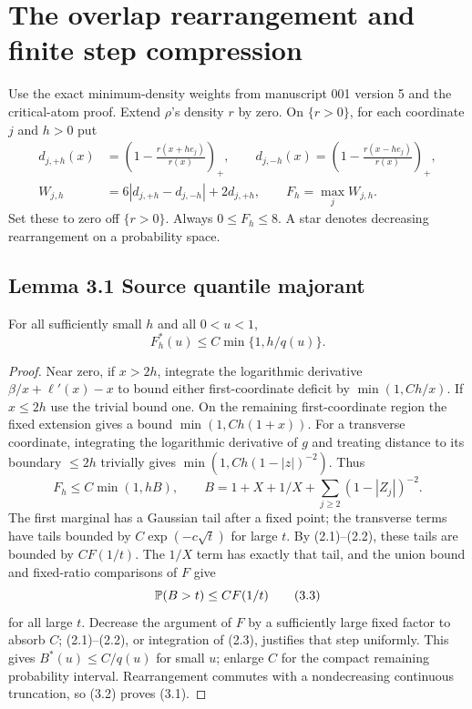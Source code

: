 \section{The overlap rearrangement and finite step compression}
Use the exact minimum-density weights from manuscript 001 version 5 and the critical-atom proof. Extend $\rho$'s density $r$ by zero. On $\{r>0\}$, for each coordinate $j$ and $h>0$ put
\begin{align*}
 d_{j,+h}(x)&=\left(1-\frac{r(x+he_j)}{r(x)}\right)_+,\qquad
 d_{j,-h}(x)=\left(1-\frac{r(x-he_j)}{r(x)}\right)_+,\\
 W_{j,h}&=6|d_{j,+h}-d_{j,-h}|+2d_{j,+h},\qquad F_h=\max_jW_{j,h}.
\end{align*}
Set these to zero off $\{r>0\}$. Always $0\le F_h\le8$. A star denotes decreasing rearrangement on a probability space.

\subsection*{Lemma 3.1 \quad Source quantile majorant}
For all sufficiently small $h$ and all $0<u<1$,
\begin{equation}
 F_h^*(u)\le C\min\{1,h/q(u)\}.\tag{3.1}
\end{equation}
\begin{proof}
Near zero, if $x>2h$, integrate the logarithmic derivative $\beta/x+\ell'(x)-x$ to bound either first-coordinate deficit by $\min(1,Ch/x)$. If $x\le2h$ use the trivial bound one. On the remaining first-coordinate region the fixed extension gives a bound $\min(1,Ch(1+x))$. For a transverse coordinate, integrating the logarithmic derivative of $g$ and treating distance to its boundary $\le2h$ trivially gives $\min(1,Ch(1-|z|)^{-2})$. Thus
\begin{equation}
 F_h\le C\min(1,hB),\qquad
 B=1+X+1/X+\sum_{j\ge2}(1-|Z_j|)^{-2}.\tag{3.2}
\end{equation}
The first marginal has a Gaussian tail after a fixed point; the transverse terms have tails bounded by $C\exp(-c\sqrt t)$ for large $t$. By (2.1)--(2.2), these tails are bounded by $CF(1/t)$. The $1/X$ term has exactly that tail, and the union bound and fixed-ratio comparisons of $F$ give
\begin{equation}
 \mathbb P(B>t)\le CF(1/t)\tag{3.3}
\end{equation}
for all large $t$. Decrease the argument of $F$ by a sufficiently large fixed factor to absorb $C$; (2.1)--(2.2), or integration of (2.3), justifies that step uniformly. This gives $B^*(u)\le C/q(u)$ for small $u$; enlarge $C$ for the compact remaining probability interval. Rearrangement commutes with a nondecreasing continuous truncation, so (3.2) proves (3.1).
\end{proof}

